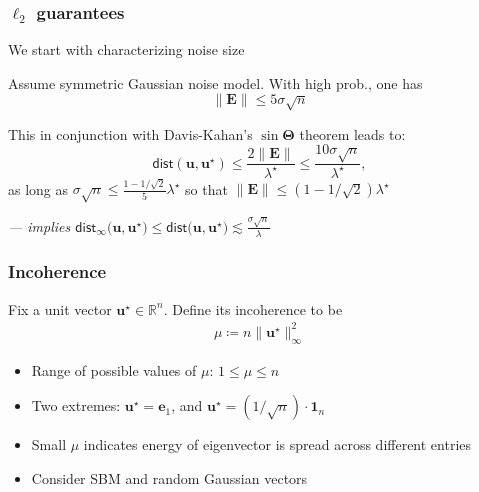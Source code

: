 \documentclass[compress,
mathserif,wide,%
]{beamer}
\begin{document}
\begin{frame}
	\frametitle{$\ell_{2}$ guarantees}
	
	We start with characterizing noise size
	 
	\begin{lemma}
	Assume symmetric Gaussian noise model. With high prob., one has
	\[
	\|\bm{E}\| \leq 5 \sigma \sqrt{n}
	\] 
	\end{lemma}
	
	\vfill 
	This in conjunction with Davis-Kahan's $\sin \bm{\Theta}$ theorem leads to: 
	\[
	\mathsf{dist}(\bm{u}, \bm{u}^{\star}) \leq \frac{2\| \bm{E} \|}{ \lambda^\star } \leq \frac{10\sigma \sqrt{n} }{ \lambda^\star},
	\]
	as long as $\sigma \sqrt{n} \leq \frac{1 - 1/\sqrt{2} }{5} \lambda^\star$ so that $\|\bm{E}\| \leq (1 - 1 / \sqrt{2}) \lambda^\star$
	
	\vfill 
	{\hfill \em \footnotesize --- implies $\mathsf{dist}_{\infty}\big(\bm{u},\bm{u}^{\star}\big) \leq \mathsf{dist}\big(\bm{u},\bm{u}^{\star}\big) \lesssim \frac{\sigma \sqrt{n} }{ \lambda }$  }
\end{frame}

\begin{frame}
	\frametitle{Incoherence}
	\begin{definition}
	Fix a unit vector $\bm{u}^\star \in \mathbb{R}^{n}$. Define its incoherence to be
	\begin{align*}
	\mu \coloneqq {n\|\bm{u}^{\star}\|_{\infty}^{2}} 
\end{align*}
\end{definition}

\vfill
\begin{itemize}
	\item Range of possible values of $\mu$: $1 \leq \mu \leq n$
	\item Two extremes: $\bm{u}^\star = \bm{e}_{1}$, and $\bm{u}^\star = (1 / \sqrt{n}) \cdot \bm{1}_{n}$
	\item Small $\mu$ indicates energy of eigenvector is spread across different entries
	\item Consider SBM and random Gaussian vectors
\end{itemize}

\end{frame}
\end{document}

